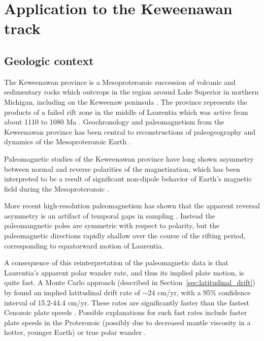 \documentclass[preprint,12pt,authoryear]{elsarticle}
\begin{document}
\section{Application to the Keweenawan track}
\label{sec:keweenawan}
\subsection{Geologic context}
The Keweenawan province is a Mesoproterozoic succession of volcanic and sedimentary rocks
which outcrops in the region around Lake Superior in northern Michigan, including on the Keweenaw peninsula \citep{henry1977paleomagnetism}.
The province represents the products of a failed rift zone in the middle of Laurentia which was active
from about 1110 to 1080 Ma \citep{swanson2014magmatic}.
Geochronology and paleomagnetism from the Keweenawan province has been central to reconstructions
of paleogeography and dynamics of the Mesoproterozoic Earth \citep[e.g.][]{li2008assembly, evans2009palaeomagnetically}.

Paleomagnetic studies of the Keweenawan province have long shown asymmetry between normal and
reverse polarities of the magnetization, which has been interpreted to be a result of significant 
non-dipole behavior of Earth's magnetic field during the Mesoproterozoic \citep{pesonen1981late, nevanlinna1983late, pesonen1983geomagnetic}.

More recent high-resolution paleomagnetism has shown that the apparent reversal asymmetry
is an artifact of temporal gaps in sampling \citep{swanson2009no, kulakov2013paleomagnetism}. 
Instead the paleomangnetic poles are symmetric with respect to polarity,
but the paleomagnetic directions rapidly shallow over the course of the rifting period,
corresponding to equatorward motion of Laurentia.

A consequence of this reinterpretation of the paleomagnetic data is that Laurentia's apparent
polar wander rate, and thus its implied plate motion, is quite fast.
A Monte Carlo approach (described in Section~\ref{sec:latitudinal_drift}) by \citet{swanson2014confirmation}
found an implied latitudinal drift rate of $\sim$24 cm/yr, with a 95\% confidence interval of 15.2-44.4 cm/yr.
These rates are significantly faster than the fastest Cenozoic plate speeds \citep{zahirovic2015tectonic}.
Possible explanations for such fast rates include faster plate speeds in the Proterozoic (possibly due to decreased
mantle viscosity in a hotter, younger Earth) or true polar wander \citep{swanson2009no}.
\end{document}
